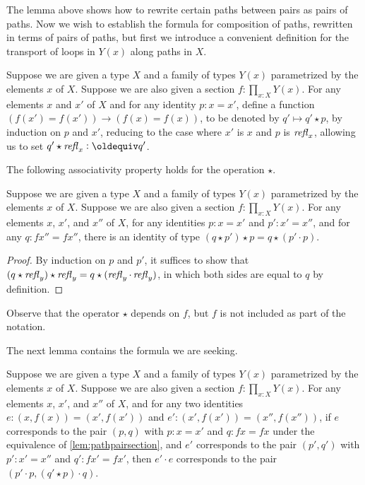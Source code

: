 The lemma above shows how to rewrite certain paths between pairs as pairs of paths.  Now we wish to establish the formula for composition of
paths, rewritten in terms of pairs of paths, but first we introduce a convenient definition for the transport of loops in $Y(x)$ along paths in
$X$.

\begin{definition}\label{def:pathsectionaction}
  Suppose we are given a type $X$ and a family of types $Y(x)$ parametrized by the elements $x$ of $X$.
  Suppose we are also given a section $f : \prod_{x:X} Y(x)$.
  For any elements $x$ and $x'$ of $X$ and for any identity $p : x = x'$, define a function $(f(x') = f(x')) \to (f(x) = f(x))$, to be denoted
  by $q' \mapsto q' \star p$, by induction on $p$ and $x'$, reducing to the case where $x'$ is $x$ and $p$ is $\mathop{{\it refl}_{x}}$, allowing us to
  set $q' \star \refl x \defeq q'$.
\end{definition}  

The following associativity property holds for the operation $\star$.

\begin{lemma}\label{def:pathsectionactionassoc}
  Suppose we are given a type $X$ and a family of types $Y(x)$ parametrized by the elements $x$ of $X$.
  Suppose we are also given a section $f : \prod_{x:X} Y(x)$.
  For any elements $x$, $x'$, and $x''$ of $X$, for any identities $p : x = x'$ and $p' : x' = x''$,
  and for any $q : f x'' = f x''$,
  there is an identity of type $ ( q \star p') \star p = q \star (p' \cdot p)$.
\end{lemma}

\begin{proof}
  By induction on $p$ and $p'$, it suffices to show that $ ( q \star \mathop{{\it refl}_{y}}) \star \mathop{{\it refl}_{y}} = q \star (\mathop{{\it refl}_{y}} \cdot \mathop{{\it refl}_{y}})$, in which both sides are
  equal to $q$ by definition.
\end{proof}

Observe that the operator $\star$ depends on $f$, but $f$ is not included as part of the notation.

The next lemma contains the formula we are seeking.

\begin{lemma}\label{lem:pathpairsectionmult}
  Suppose we are given a type $X$ and a family of types $Y(x)$ parametrized by the elements $x$ of $X$.
  Suppose we are also given a section $f : \prod_{x:X} Y(x)$.
  For any elements $x$, $x'$, and $x''$ of $X$, and for any two identities $e : (x,f(x)) = (x',f(x'))$ and $e' : (x',f(x')) = (x'',f(x''))$,
  if $e$ corresponds to the pair $(p,q)$ with $p : x = x'$ and $q : f x = f x$ under the equivalence of \cref{lem:pathpairsection},
  and $e'$ corresponds to the pair $(p',q')$ with $p' : x' = x''$ and $q' : f x' = f x'$,
  then $e' \cdot e$ corresponds to the pair $(p' \cdot p , (q' \star p) \cdot q)$.
\end{lemma}

